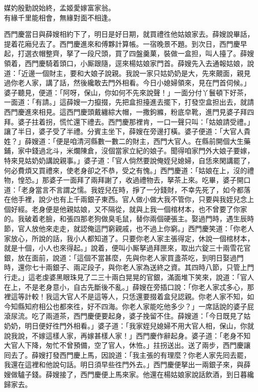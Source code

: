 \begin{myquote} 
媒妁殷勤說始終，孟姬愛嫁富家翁。\\有緣千里能相會，無緣對面不相逢。
\end{myquote} 

西門慶當日與薛嫂相約下了，明日是好日期，就買禮徃他姑娘家去。薛嫂說畢話，提着花廂兒去了。西門慶進來和傅夥計算帳。一宿晚景不題。到次日，西門慶早起，打選衣帽整齊，拏了一段尺頭，買了四盤羹菓，裝做一盒担，叫人擡了。薛嫂領着，西門慶騎着頭口，小厮跟隨，逕來楊姑娘家門首。薛嫂先入去通報姑娘，說道：「近邊一個財主，{}要和大娘子說親。我說一家只姑奶奶是大，先來覿面，親見過你老人家，講了話，{}然後纔敢去門外相看。今日小媳婦領來，見在門首伺候。」婆子聽見，便道：「阿呀，{}保山，你如何不先來說聲！」一面分付丫鬟頓下好茶，一面道：「有請。」這薛嫂一力攛掇，先把盒担擡進去擺下，打發空盒担出去，就請西門慶進來相見。這西門慶頭戴纏綜大帽，一撒鉤縧，粉底皁靴，進門見婆子拜四拜。婆子拄着拐，慌忙還下禮去。西門慶那裡肯，一口一聲只叫：「姑娘請受禮。」讓了半日，婆子受了半禮。分賓主坐下，薛嫂在旁邊打橫。婆子便道：「大官人貴姓？」薛嫂道：「便是咱清河縣數一數二的財主，西門大官人。在縣前開個大生藥鋪，家中錢過北斗，米爛陳倉，沒個當家立紀的娘子。聞得咱家門外大娘子要嫁，特來見姑奶奶講說親事。」婆子道：「官人倘然要說俺姪兒媳婦，自恁來閑講罷了，何必費煩又買禮來，使老身卻之不恭，受之有愧。」西門慶道：「姑娘在上，沒的禮物，惶恐。」那婆子一面拜了兩拜謝了，收過禮物去，拏茶上來。吃畢，婆子開口道：「老身當言不言謂之懦。{}我姪兒在時，掙了一分錢財，不幸先死了，如今都落在他手裡，說少也有上千兩銀子東西。官人做小做大我不管你，只要與我姪兒念上個好經。老身便是他親姑娘，又不隔從，就與上我一個棺材本，也不曾要了你家的。我破着老臉，和張四那老狗做臭毛鼠，替你兩個硬張主。娶過門時，遇生辰時節，官人放他來走走，就認俺這門窮親戚，也不過上你窮。」{}西門慶笑道：「你老人家放心，所說的話，我小人都知道了。只要你老人家主張得定，休說一個棺材本，就是十個，小人也來得起。」說着，便叫小厮拏過拜匣來，取出六錠三十兩雪花官銀，放在面前，說道：「這個不當甚麼，先與你老人家買盞茶吃，到明日娶過門時，還你七十兩銀子、兩疋段子，與你老人家為送終之資。其四時八節，只管上門行走。」這老虔婆黑眼珠見了二三十兩白晃晃的官銀，滿面堆下笑來，說道：「官人在上，不是老身意小，自古先斷後不亂。」薛嫂在旁插口說：「你老人家忒多心，那裡這等計較！我這大官人不是這等人，只恁還要掇着盒兒認親。你老人家不知，如今知縣知府相公也都來徃，好不四海。你老人家能吃他多少？」一席話說的婆子屁滾尿流。吃了兩道茶，西門慶便要起身，婆子挽留不住。薛嫂道：「今日既見了姑奶奶，明日便好徃門外相看。」婆子道：「我家姪兒媳婦不用大官人相，保山，你就說我說，不嫁這樣人家，再嫁甚樣人家！」西門慶作辭起身。婆子道：「老身不知大官人下降，匆忙不曾預備，空了官人，休恠。」拄拐送出。送了兩步，西門慶讓囘去了。薛嫂打發西門慶上馬，因說道：「我主張的有理麼？你老人家先囘去罷，我還在這裡和他說句話。明日須早些徃門外去。」西門慶便拏出一兩銀子來，與薛嫂做驢子錢。薛嫂接了，西門慶便上馬來家。他還在楊姑娘家說話飲酒，到日暮纔歸家去。

